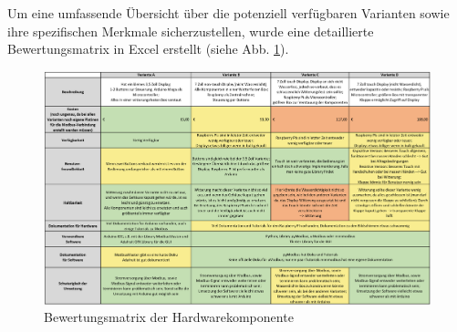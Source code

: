 Um eine umfassende Übersicht über die potenziell verfügbaren Varianten sowie ihre spezifischen Merkmale sicherzustellen, wurde eine detaillierte Bewertungsmatrix in Excel erstellt (siehe Abb. \ref{fig:matrix}).
\begin{landscape}
	\begin{figure}[H]
		\centering
		\includegraphics[width=1\linewidth]{Bilder/bewertungsmatrix}
		\caption{Bewertungsmatrix der Hardwarekomponente}
		\label{fig:matrix}
	\end{figure}
\end{landscape}